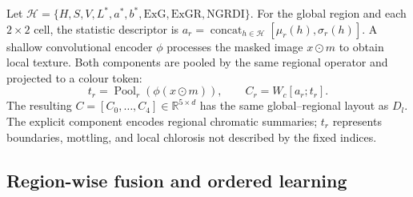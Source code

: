 \documentclass[10pt,letterpaper,twocolumn]{article}
\begin{document}
Let $\mathcal H=\{H,S,V,L^*,a^*,b^*,\mathrm{ExG},\mathrm{ExGR},\mathrm{NGRDI}\}$. For the global region and each $2\!\times\!2$ cell, the statistic descriptor is $a_r=\operatorname{concat}_{h\in\mathcal H}[\mu_r(h),\sigma_r(h)]$. A shallow convolutional encoder $\phi$ processes the masked image $x\odot m$ to obtain local texture. Both components are pooled by the same regional operator and projected to a colour token:
\begin{equation}
t_r=\operatorname{Pool}_r(\phi(x\odot m)),\qquad C_r=W_c[a_r;t_r].
\label{eq:colour}
\end{equation}
The resulting $C=[C_0,\ldots,C_4]\in\mathbb{R}^{5\times d}$ has the same global--regional layout as $D_l$. The explicit component encodes regional chromatic summaries; $t_r$ represents boundaries, mottling, and local chlorosis not described by the fixed indices.

\subsection{Region-wise fusion and ordered learning}
\end{document}
